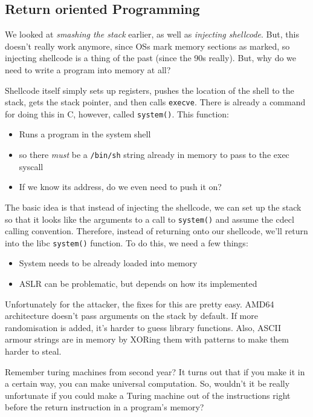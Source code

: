 \documentclass[11pt,a4paper,titlepage,dvipsnames,cmyk]{scrartcl}
\begin{document}
\subsection{Return oriented Programming}
We looked at \textit{smashing the stack} earlier, as well as \textit{injecting shellcode}. But, this doesn't really work anymore, since OSs mark memory sections as marked, so injecting shellcode is a thing of the past (since the 90s really). But, why do we need to write a program into memory at all?

Shellcode itself simply sets up registers, pushes the location of the shell to the stack, gets the stack pointer, and then calls \texttt{execve}. There is already a command for doing this in C, however, called \texttt{system()}. This function:
\begin{itemize}
    \item Runs a program in the system shell
    \item so there \textit{must} be a \texttt{/bin/sh} string already in memory to pass to the exec syscall
    \item If we know its address, do we even need to push it on?
\end{itemize}

The basic idea is that instead of injecting the shellcode, we can set up the stack so that it looks like the arguments to a call to \texttt{system()} and assume the cdecl calling convention. Therefore, instead of returning onto our shellcode, we'll return into the libc \texttt{system()} function.
To do this, we need a few things:
\begin{itemize}
    \item System needs to be already loaded into memory
    \item ASLR can be problematic, but depends on how its implemented
\end{itemize}

Unfortunately for the attacker, the fixes for this are pretty easy. AMD64 architecture doesn't pass arguments on the stack by default. If more randomisation is added, it's harder to guess library functions. Also, ASCII armour strings are in memory by XORing them with patterns to make them harder to steal.

Remember turing machines from second year? It turns out that if you make it in a certain way, you can make universal computation. So, wouldn't it be really unfortunate if you could make a Turing machine out of the instructions right before the return instruction in a program's memory?
\end{document}
